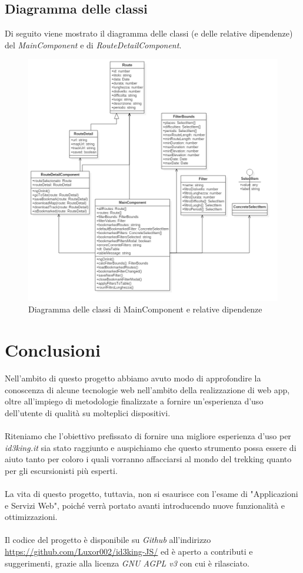 \documentclass[11pt]{report}
\begin{document}
\subsection{Diagramma delle classi}
Di seguito viene mostrato il diagramma delle classi (e delle relative dipendenze) del \textit{MainComponent} e di \textit{RouteDetailComponent}.
\begin{figure}[h]
	\centering
	\includegraphics[scale=0.45]{ClassDiagram_Frontend}
	\caption{Diagramma delle classi di MainComponent e relative dipendenze \label{ClassDiagram_Frontend}}
\end{figure}
\pagebreak

\section{Conclusioni}
Nell'ambito di questo progetto abbiamo avuto modo di approfondire la conoscenza di alcune tecnologie web nell'ambito della realizzazione di web app, oltre all'impiego di metodologie finalizzate a fornire un'esperienza d'uso dell'utente di qualità su molteplici dispositivi.
\\\\Riteniamo che l'obiettivo prefissato di fornire una migliore esperienza d'uso per \textit{id3king.it} sia stato raggiunto e auspichiamo che questo strumento possa essere di aiuto tanto per coloro i quali vorranno affacciarsi al mondo del trekking quanto per gli escursionisti più esperti.
\\\\La vita di questo progetto, tuttavia, non si esaurisce con l'esame di "Applicazioni e Servizi Web", poiché verrà portato avanti introducendo nuove funzionalità e ottimizzazioni.
\\\\Il codice del progetto è disponibile su \textit{Github} all'indirizzo \url{https://github.com/Luxor002/id3king-JS/} ed è aperto a contributi e suggerimenti, grazie alla licenza \textit{GNU AGPL v3} con cui è rilasciato.
\end{document}
